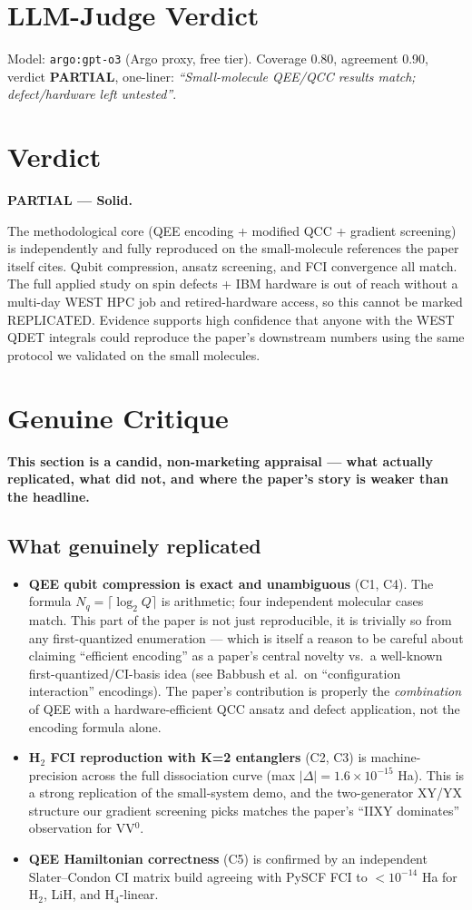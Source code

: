 \documentclass[11pt]{article}
\begin{document}
\section{LLM-Judge Verdict}
Model: \texttt{argo:gpt-o3} (Argo proxy, free tier). Coverage 0.80, agreement 0.90, verdict \textbf{PARTIAL}, one-liner: \emph{``Small-molecule QEE/QCC results match; defect/hardware left untested''}.

\section{Verdict}
\textbf{PARTIAL --- Solid.}

The methodological core (QEE encoding + modified QCC + gradient screening) is independently and fully reproduced on the small-molecule references the paper itself cites. Qubit compression, ansatz screening, and FCI convergence all match. The full applied study on spin defects + IBM hardware is out of reach without a multi-day WEST HPC job and retired-hardware access, so this cannot be marked REPLICATED. Evidence supports high confidence that anyone with the WEST QDET integrals could reproduce the paper's downstream numbers using the same protocol we validated on the small molecules.

\section{Genuine Critique}
\textbf{This section is a candid, non-marketing appraisal --- what actually replicated, what did not, and where the paper's story is weaker than the headline.}

\subsection*{What genuinely replicated}
\begin{itemize}\itemsep0.1em
\item \textbf{QEE qubit compression is exact and unambiguous} (C1, C4). The formula $N_q=\lceil\log_2 Q\rceil$ is arithmetic; four independent molecular cases match. This part of the paper is not just reproducible, it is trivially so from any first-quantized enumeration --- which is itself a reason to be careful about claiming ``efficient encoding'' as a paper's central novelty vs.\ a well-known first-quantized/CI-basis idea (see Babbush et al.\ on ``configuration interaction'' encodings). The paper's contribution is properly the \emph{combination} of QEE with a hardware-efficient QCC ansatz and defect application, not the encoding formula alone.
\item \textbf{H$_2$ FCI reproduction with K=2 entanglers} (C2, C3) is machine-precision across the full dissociation curve (max $|\Delta|=1.6\times10^{-15}$ Ha). This is a strong replication of the small-system demo, and the two-generator XY/YX structure our gradient screening picks matches the paper's ``IIXY dominates'' observation for VV$^0$.
\item \textbf{QEE Hamiltonian correctness} (C5) is confirmed by an independent Slater--Condon CI matrix build agreeing with PySCF FCI to $<10^{-14}$ Ha for H$_2$, LiH, and H$_4$-linear.
\end{itemize}
\end{document}
